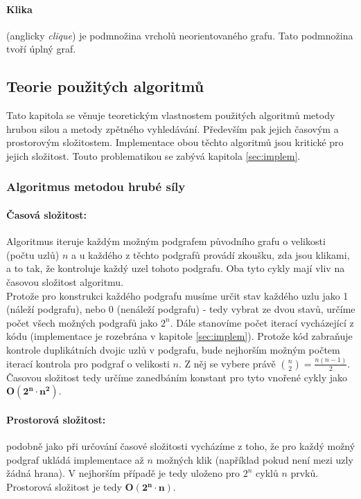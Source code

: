 \documentclass[a4paper]{article}
\begin{document}
        \paragraph{Klika} (anglicky \textit{clique}) je podmnožina vrcholů neorientovaného grafu. Tato podmnožina tvoří úplný graf.\cite{cliq-definition}

    \subsection{Teorie použitých algoritmů} \label{subsec:complexities_teo}
        Tato kapitola se věnuje teoretickým vlastnostem použitých algoritmů metody hrubou silou a metody zpětného vyhledávání. Především pak jejich časovým a prostorovým složitostem. Implementace obou těchto algoritmů jsou kritické pro jejich složitost. Touto problematikou se zabývá kapitola \ref{sec:implem}.

        \subsubsection{Algoritmus metodou hrubé síly}
            \paragraph{Časová složitost:} Algoritmus iteruje každým možným podgrafem původního grafu o velikosti (počtu uzlů) $n$ a u každého z těchto podgrafů provádí zkoušku, zda jsou klikami, a to tak, že kontroluje každý uzel tohoto podgrafu. Oba tyto cykly mají vliv na časovou složitost algoritmu.\\[3pt]
            \noindent
            Protože pro konstrukci každého podgrafu musíme určit stav každého uzlu jako 1 (náleží podgrafu), nebo 0 (nenáleží podgrafu) - tedy vybrat ze dvou stavů, určíme počet všech možných podgrafů jako $2^n$. Dále stanovíme počet iterací vycházející z kódu (implementace je rozebrána v kapitole \ref{sec:implem}). Protože kód zabraňuje kontrole duplikátních dvojic uzlů v podgrafu, bude nejhorším možným počtem iterací kontrola pro podgraf o velikosti $n$. Z něj se vybere právě $\binom{n}{2} = \frac{n(n-1)}{2}$.\\[3pt]
            \noindent
            Časovou složitost tedy určíme zanedbáním konstant pro tyto vnořené cykly jako $\mathbf{O(2^n \cdot n^2)}$.

            \paragraph{Prostorová složitost:} podobně jako při určování časové složitosti vycházíme z toho, že pro každý možný podgraf ukládá implementace až $n$ možných klik (například pokud není mezi uzly žádná hrana). V nejhorším případě je tedy uloženo pro $2^n$ cyklů $n$ prvků. Prostorová složitost je tedy $\mathbf{O(2^n \cdot n)}$.
\end{document}
